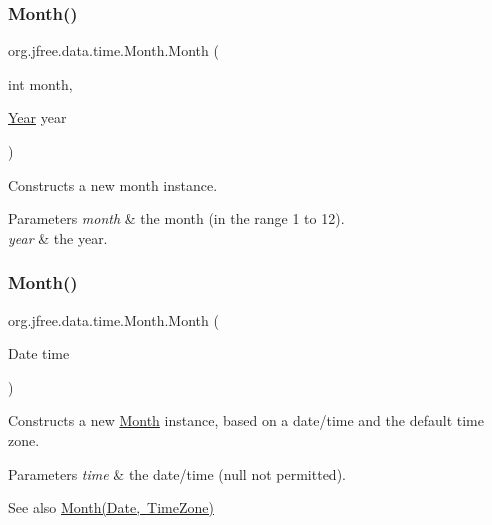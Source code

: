 \subsubsection{\texorpdfstring{Month()}{Month()}\hspace{0.1cm}{\footnotesize\ttfamily [3/6]}}
{\footnotesize\ttfamily org.\+jfree.\+data.\+time.\+Month.\+Month (\begin{DoxyParamCaption}\item[{int}]{month,  }\item[{\mbox{\hyperlink{classorg_1_1jfree_1_1data_1_1time_1_1_year}{Year}}}]{year }\end{DoxyParamCaption})}

Constructs a new month instance.


\begin{DoxyParams}{Parameters}
{\em month} & the month (in the range 1 to 12). \\
\hline
{\em year} & the year. \\
\hline
\end{DoxyParams}
\mbox{\label{classorg_1_1jfree_1_1data_1_1time_1_1_month_ac17a55a0ba55529c1490bc88637a39ef}} 
\subsubsection{\texorpdfstring{Month()}{Month()}\hspace{0.1cm}{\footnotesize\ttfamily [4/6]}}
{\footnotesize\ttfamily org.\+jfree.\+data.\+time.\+Month.\+Month (\begin{DoxyParamCaption}\item[{Date}]{time }\end{DoxyParamCaption})}

Constructs a new {\ttfamily \mbox{\hyperlink{classorg_1_1jfree_1_1data_1_1time_1_1_month}{Month}}} instance, based on a date/time and the default time zone.


\begin{DoxyParams}{Parameters}
{\em time} & the date/time ({\ttfamily null} not permitted).\\
\hline
\end{DoxyParams}
\begin{DoxySeeAlso}{See also}
\mbox{\hyperlink{classorg_1_1jfree_1_1data_1_1time_1_1_month_a77f47ebcba75484c9b3054b4eb201ccc}{Month(\+Date, Time\+Zone)}} 
\end{DoxySeeAlso}
\mbox{\label{classorg_1_1jfree_1_1data_1_1time_1_1_month_a77f47ebcba75484c9b3054b4eb201ccc}} 
